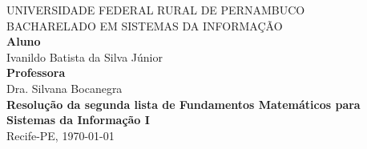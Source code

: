 \documentclass[12pt]{article}
\begin{document}
\begin{titlepage}
\centering
 \vfill
  \begin{center}


   {\large {UNIVERSIDADE FEDERAL RURAL DE PERNAMBUCO \\
BACHARELADO EM SISTEMAS DA INFORMAÇÃO
}}\\[4cm]

   {\large {\textbf{Aluno} \\
   Ivanildo Batista da Silva Júnior
   }}\\[.5cm]
   
   {\large {\textbf{Professora}\\ Dra. Silvana Bocanegra}}\\[3cm]
   {\large \textbf{Resolução da segunda lista de Fundamentos Matemáticos para Sistemas da Informação I}}\\[10.5cm] 
   
\normalsize {Recife-PE, \today}
\newpage

  \vfill
\end{center}
\end{titlepage}


\newpage

\tableofcontents
\thispagestyle{empty}
\newpage

\newpage
\setcounter{page}{1}
\end{document}
